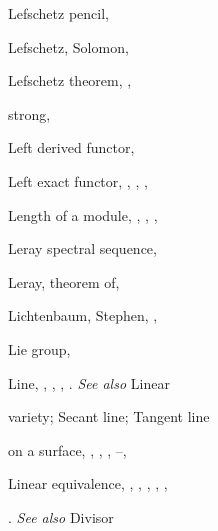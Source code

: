 {{\noindent\hspace*{0.0bp}Lefschetz pencil, \par
\noindent\hspace*{0.0bp}Lefschetz, Solomon, \par
\noindent\hspace*{0.0bp}Lefschetz theorem, , \par
\noindent\hspace*{7.5bp}strong, \par
\noindent\hspace*{0.0bp}Left derived functor, \par
\noindent\hspace*{0.0bp}Left exact functor, , , , \par
\noindent\hspace*{0.0bp}Length of a module, , , , \par
\noindent\hspace*{0.0bp}Leray spectral sequence, \par
\noindent\hspace*{0.0bp}Leray, theorem of, \par
\noindent\hspace*{0.0bp}Lichtenbaum, Stephen, , \par
\noindent\hspace*{0.0bp}Lie group, \par
\noindent\hspace*{0.0bp}Line, , , , . \emph{See also} Linear\par
\noindent\hspace*{15.0bp}variety; Secant line; Tangent line\par
\noindent\hspace*{7.5bp}on a surface, , , , --, \par
\noindent\hspace*{0.0bp}Linear equivalence, , , , , ,\par
\noindent\hspace*{15.0bp}. \emph{See also} Divisor\par
}}
